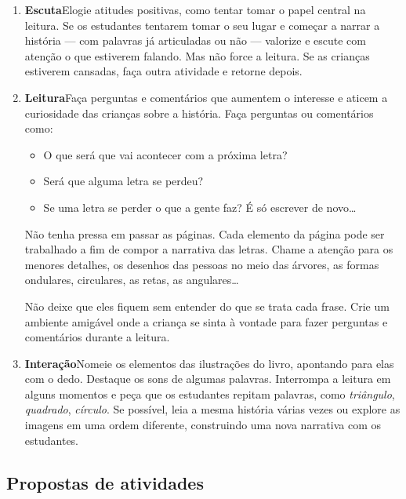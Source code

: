 \documentclass[11pt]{extarticle}
\begin{document}
\begin{enumerate}
\item \textbf{Escuta}\quad Elogie atitudes positivas, como 
tentar tomar o papel central na leitura. Se os estudantes tentarem 
tomar o seu lugar e começar a narrar a história --- com palavras já articuladas 
ou não --- valorize e escute com atenção o que estiverem falando. Mas não 
force a leitura. Se as crianças estiverem cansadas, faça outra atividade 
e retorne depois. 



\item \textbf{Leitura}\quad Faça perguntas e comentários que aumentem o 
interesse e aticem a curiosidade das crianças sobre a história. Faça 
perguntas ou comentários como: 

\begin{itemize}
\item O que será que vai acontecer com a próxima letra?
\item Será que alguma letra se perdeu?
\item Se uma letra se perder o que a gente faz? É só escrever de novo\dots{}
\end{itemize}

Não tenha pressa em passar as páginas. Cada elemento da página pode ser
trabalhado a fim de compor a narrativa das letras. Chame a atenção para
os menores detalhes, os desenhos das pessoas no meio das árvores,
as formas ondulares, circulares, as retas, as angulares\dots{}

Não deixe que eles fiquem sem entender do que se trata cada frase. Crie 
um ambiente amigável onde a criança se sinta à vontade para fazer 
perguntas e comentários durante a leitura.


\item \textbf{Interação}\quad Nomeie os elementos das ilustrações 
do livro, apontando para elas com o dedo. Destaque os sons de algumas 
palavras. Interrompa a leitura em alguns momentos e peça que 
os estudantes repitam palavras, como \textit{triângulo}, \textit{quadrado}, \textit{círculo}. Se possível, 
leia a mesma história várias vezes ou explore as imagens em uma ordem 
diferente, construindo uma nova narrativa com os estudantes. 
\end{enumerate}


\subsection{Propostas de atividades}
\end{document}
